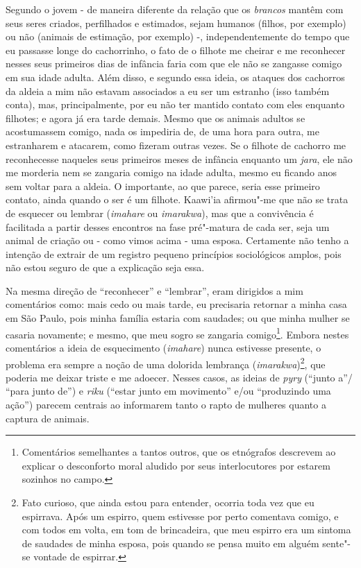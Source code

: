 Segundo o jovem - de maneira diferente da relação que os \emph{brancos}
mantêm com seus seres criados, perfilhados e estimados, sejam humanos
(filhos, por exemplo) ou não (animais de estimação, por exemplo) -,
independentemente do tempo que eu passasse longe do cachorrinho, o fato
de o filhote me cheirar e me reconhecer nesses seus primeiros dias de
infância faria com que ele não se zangasse comigo em sua idade adulta.
Além disso, e segundo essa ideia, os ataques dos cachorros da aldeia a
mim não estavam associados a eu ser um estranho (isso também conta),
mas, principalmente, por eu não ter mantido contato com eles enquanto
filhotes; e agora já era tarde demais. Mesmo que os animais adultos se
acostumassem comigo, nada os impediria de, de uma hora para outra, me
estranharem e atacarem, como fizeram outras vezes. Se o filhote de
cachorro me reconhecesse naqueles seus primeiros meses de infância
enquanto um \emph{jara}, ele não me morderia nem se zangaria comigo na
idade adulta, mesmo eu ficando anos sem voltar para a aldeia. O
importante, ao que parece, seria esse primeiro contato, ainda quando o
ser é um filhote. Kaawi'ia afirmou"-me que não se trata de esquecer ou
lembrar (\emph{imahare} ou \emph{imarakwa}), mas que a convivência é
facilitada a partir desses encontros na fase pré"-matura de cada ser,
seja um animal de criação ou - como vimos acima - uma esposa. Certamente
não tenho a intenção de extrair de um registro pequeno princípios
sociológicos amplos, pois não estou seguro de que a explicação seja
essa.

Na mesma direção de ``reconhecer'' e ``lembrar'', eram dirigidos a mim
comentários como: mais cedo ou mais tarde, eu precisaria retornar a
minha casa em São Paulo, pois minha família estaria com saudades; ou que
minha mulher se casaria novamente; e mesmo, que meu sogro se zangaria
comigo\footnote{Comentários semelhantes a tantos outros, que os
  etnógrafos descrevem ao explicar o desconforto moral aludido por seus
  interlocutores por estarem sozinhos no campo.}. Embora nestes
comentários a ideia de esquecimento (\emph{imahare}) nunca estivesse
presente, o problema era sempre a noção de uma dolorida lembrança
(\emph{imarakwa})\footnote{Fato curioso, que ainda estou para entender,
  ocorria toda vez que eu espirrava. Após um espirro, quem estivesse por
  perto comentava comigo, e com todos em volta, em tom de brincadeira,
  que meu espirro era um sintoma de saudades de minha esposa, pois
  quando se pensa muito em alguém sente"-se vontade de espirrar.}, que
poderia me deixar triste e me adoecer. Nesses casos, as ideias de
\emph{pyry} (``junto a''/ ``para junto de'') e \emph{riku} (``estar junto em
movimento'' e/ou ``produzindo uma ação'') parecem centrais ao informarem
tanto o rapto de mulheres quanto a captura de animais.

